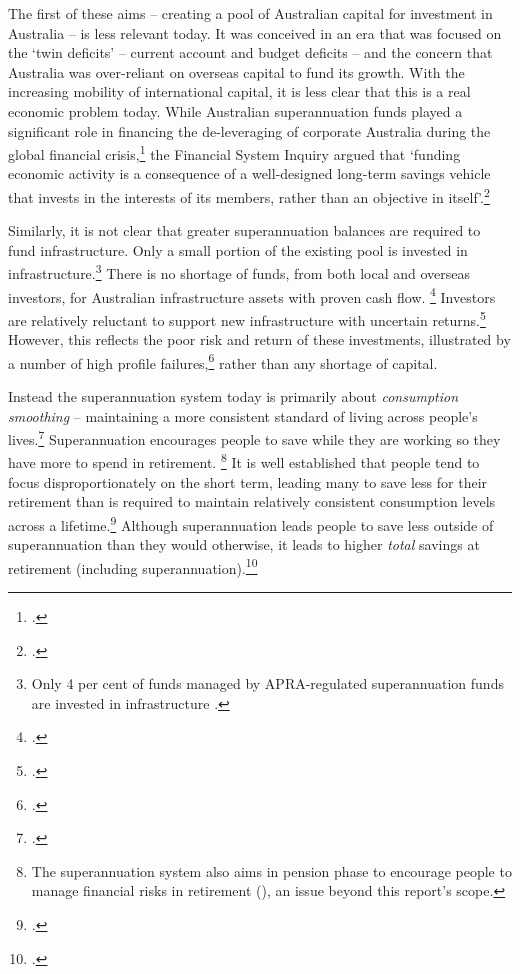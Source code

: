 The first of these aims – creating a pool of Australian capital for investment in Australia – is less relevant today. It was conceived in an era that was focused on the ‘twin deficits’ – current account and budget deficits – and the concern that Australia was over-reliant on overseas capital to fund its growth. With the increasing mobility of international capital, it is less clear that this is a real economic problem today. While Australian superannuation funds played a significant role in financing the de-leveraging of corporate Australia during the global financial crisis,\footcites{Henry2009}{RBA2014FinancialSystemInquirySubmission} the Financial System Inquiry argued that ‘funding economic activity is a consequence of a well-designed long-term savings vehicle that invests in the interests of its members, rather than an objective in itself’.\footcite[][98]{FinancialSystemsInquiry2015}

Similarly, it is not clear that greater superannuation balances are required to fund infrastructure. Only a small portion of the existing pool is invested in infrastructure.\footnote{Only 4 per cent of funds managed by APRA-regulated superannuation funds are invested in infrastructure \textcite[][Table~1d]{APRA2015a}.} 
There is no shortage of funds, from both local and overseas investors, for Australian infrastructure assets with proven cash flow.%
\footcite[][188]{ProductivityCommission2013PublicInfrastructure}
Investors are relatively reluctant to support new infrastructure with uncertain returns.\footcite[][131]{ProductivityCommission2013PublicInfrastructure}  However, this reflects the poor risk and return of these investments, illustrated by a number of high profile failures,\footcite[][10]{ElaurantMcDougall2015} rather than any shortage of capital.

Instead the superannuation system today is primarily about \emph{consumption smoothing} – maintaining a more consistent standard of living across people’s lives.\footcite[][288]{MirrleesAdamBesleyEtAl2011} Superannuation encourages people to save while they are working so they have more to spend in retirement.%
\footnote{The superannuation system also aims in pension phase to encourage people to manage financial risks in retirement (\textcite{MaddockKing2015}), an issue beyond this report’s scope.} %
 It is well established that people tend to focus disproportionately on the short term, leading many to save less for their retirement than is required to maintain relatively consistent consumption levels across a lifetime.\footcite[][4]{FinancialSystemsInquiry2015} Although superannuation leads people to save less outside of superannuation than they would otherwise, it leads to higher \emph{total} savings at retirement (including superannuation).\footcites{GruenSoding2011}{Connolly2007}

